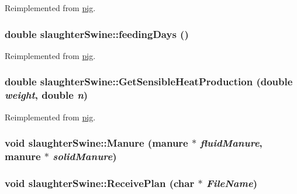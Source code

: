 Reimplemented from \hyperlink{classpig_ace82dae0cc5b75ed3051b145e12d1803}{pig}.\hypertarget{classslaughter_swine_ada8ac1126ab09ff0e2077598b57aedb7}{
\subsubsection[{feedingDays}]{\setlength{\rightskip}{0pt plus 5cm}double slaughterSwine::feedingDays ()}}
\label{classslaughter_swine_ada8ac1126ab09ff0e2077598b57aedb7}


Reimplemented from \hyperlink{classpig_a5ab403443122aaaeb16d82c5844b75f6}{pig}.\hypertarget{classslaughter_swine_a46e7d9f7b8959aaf973d82cced115232}{
\subsubsection[{GetSensibleHeatProduction}]{\setlength{\rightskip}{0pt plus 5cm}double slaughterSwine::GetSensibleHeatProduction (double {\em weight}, \/  double {\em n})}}
\label{classslaughter_swine_a46e7d9f7b8959aaf973d82cced115232}


Reimplemented from \hyperlink{classpig_a2c7c1a356646211e31753de053977520}{pig}.\hypertarget{classslaughter_swine_a53cd5ea2a24d0991907f2bf9707acfe4}{
\subsubsection[{Manure}]{\setlength{\rightskip}{0pt plus 5cm}void slaughterSwine::Manure ({\bf manure} $\ast$ {\em fluidManure}, \/  {\bf manure} $\ast$ {\em solidManure})}}
\label{classslaughter_swine_a53cd5ea2a24d0991907f2bf9707acfe4}
\hypertarget{classslaughter_swine_aeaaac01b283e4bc09d60b4f4bd65c442}{
\subsubsection[{ReceivePlan}]{\setlength{\rightskip}{0pt plus 5cm}void slaughterSwine::ReceivePlan (char $\ast$ {\em FileName})}}
\label{classslaughter_swine_aeaaac01b283e4bc09d60b4f4bd65c442}



